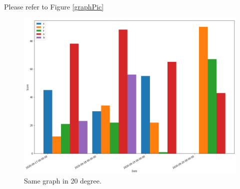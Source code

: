 \documentclass{article}
\begin{document}
Please refer to Figure \ref{graphPic}
\blindtext
\begin{figure}
\includegraphics[width=1.1\textwidth, angle=20]{4_imgMng.png}
\caption{Same graph in 20 degree.}
\end{figure}
\blindtext

\blindtext

\blindtext
\end{document}
